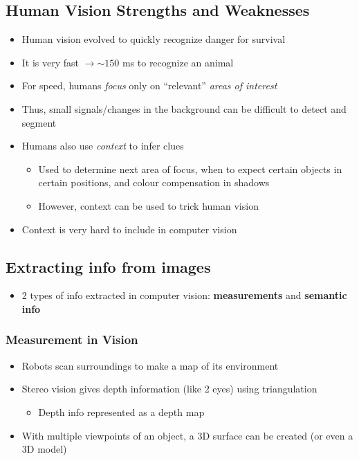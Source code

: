 \documentclass[letterpaper,12pt]{article}
\newcommand{\lra}{\ensuremath{\longrightarrow{}}}
\begin{document}
\subsection{Human Vision Strengths and Weaknesses}
\begin{itemize}
 \item Human vision evolved to quickly recognize danger for survival
 \item It is very fast \lra $\sim150$ ms to recognize an animal
 \item For speed, humans \textit{focus} only on ``relevant'' \textit{areas of interest}
 \item Thus, small signals/changes in the background can be difficult to detect and segment
 \item Humans also use \textit{context} to infer clues
       \begin{itemize}
        \item Used to determine next area of focus, when to expect certain objects in certain positions, and colour compensation in shadows
        \item However, context can be used to trick human vision
       \end{itemize}
 \item Context is very hard to include in computer vision
\end{itemize}

\subsection{Extracting info from images}

\begin{itemize}
 \item 2 types of info extracted in computer vision: \textbf{measurements} and \textbf{semantic info}
\end{itemize}

\subsubsection{Measurement in Vision}
\begin{itemize}
 \item Robots scan surroundings to make a map of its environment
 \item Stereo vision gives depth information (like 2 eyes) using triangulation
       \begin{itemize}
        \item Depth info represented as a depth map
       \end{itemize}
 \item With multiple viewpoints of an object, a 3D surface can be created (or even a 3D model)
\end{itemize}
\end{document}
